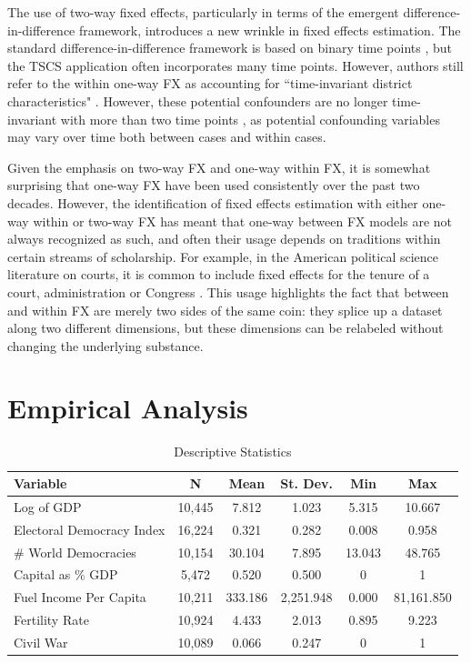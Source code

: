 \documentclass{article}[12pt]
\begin{document}
The use of two-way fixed effects, particularly in terms of the emergent difference-in-difference framework, introduces a new wrinkle in fixed effects estimation. The standard difference-in-difference framework is based on binary time points \parencite{shahidur2010}, but the TSCS application often incorporates many time points. However, authors still refer to the within one-way FX as accounting for ``time-invariant district characteristics" \parencite[484]{anzia2011}. However, these potential confounders are no longer time-invariant with more than two time points \parencite{imai2016}, as potential confounding variables may vary over time both between cases and within cases. 

Given the emphasis on two-way FX and one-way within FX, it is somewhat surprising that one-way FX have been used consistently over the past two decades. However, the identification of fixed effects estimation with either one-way within or two-way FX has meant that one-way between FX models are not always recognized as such, and often their usage depends on traditions within certain streams of scholarship. For example, in the American political science literature on courts, it is common to include fixed effects for the tenure of a court, administration or Congress \parencite{jenkins2012,hall2014,boyd2010,lazarus2009}. This usage highlights the fact that between and within FX are merely two sides of the same coin: they splice up a dataset along two different dimensions, but these dimensions can be relabeled without changing the underlying substance.

\section{Empirical Analysis}

\begin{table}[!htbp] \centering 
	\begin{tabular}{@{\extracolsep{5pt}}lccccc} 

		Variable & \multicolumn{1}{c}{N} & \multicolumn{1}{c}{Mean} & \multicolumn{1}{c}{St. Dev.} & \multicolumn{1}{c}{Min} & \multicolumn{1}{c}{Max} \\ 
		\midrule 
		Log of GDP & 10,445 & 7.812 & 1.023 & 5.315 & 10.667 \\ 
		Electoral Democracy Index & 16,224 & 0.321 & 0.282 & 0.008 & 0.958 \\ 
		\# World Democracies & 10,154 & 30.104 & 7.895 & 13.043 & 48.765 \\ 
		Capital as \% GDP & 5,472 & 0.520 & 0.500 & 0 & 1 \\ 
		Fuel Income Per Capita & 10,211 & 333.186 & 2,251.948 & 0.000 & 81,161.850 \\ 
		Fertility Rate & 10,924 & 4.433 & 2.013 & 0.895 & 9.223 \\ 
		Civil War & 10,089 & 0.066 & 0.247 & 0 & 1 \\ 
	\end{tabular} 
	\caption{Descriptive Statistics} 
	\label{describe} 
\end{table} 
\end{document}
